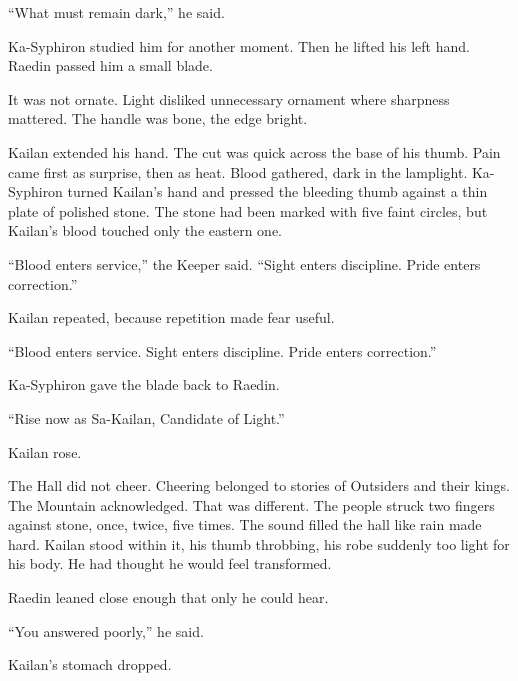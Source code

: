 “What must remain dark,” he said.\par

Ka-Syphiron studied him for another moment. Then he lifted his left hand. Raedin passed him a small blade.\par

It was not ornate. Light disliked unnecessary ornament where sharpness mattered. The handle was bone, the edge bright.\par

Kailan extended his hand. The cut was quick across the base of his thumb. Pain came first as surprise, then as heat. Blood gathered, dark in the lamplight. Ka-Syphiron turned Kailan’s hand and pressed the bleeding thumb against a thin plate of polished stone. The stone had been marked with five faint circles, but Kailan’s blood touched only the eastern one.\par

“Blood enters service,” the Keeper said. “Sight enters discipline. Pride enters correction.”\par

Kailan repeated, because repetition made fear useful.\par

“Blood enters service. Sight enters discipline. Pride enters correction.”\par

Ka-Syphiron gave the blade back to Raedin.\par

“Rise now as Sa-Kailan, Candidate of Light.”\par

Kailan rose.\par

The Hall did not cheer. Cheering belonged to stories of Outsiders and their kings. The Mountain acknowledged. That was different. The people struck two fingers against stone, once, twice, five times. The sound filled the hall like rain made hard. Kailan stood within it, his thumb throbbing, his robe suddenly too light for his body. He had thought he would feel transformed.\par

Raedin leaned close enough that only he could hear.\par

“You answered poorly,” he said.\par

Kailan’s stomach dropped.\par

